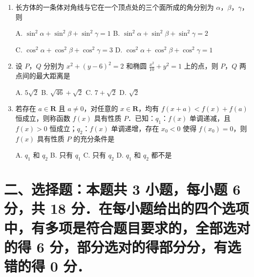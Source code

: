 \documentclass[a4paper,12pt]{ctexart}
\begin{document}
\begin{enumerate}[leftmargin=2em,itemsep=4pt]
\item 长方体的一条体对角线与它在一个顶点处的三个面所成的角分别为 $\alpha$，$\beta$，$\gamma$，则

\vspace{1pt}
{\hspace{1.5em} A.\; $\sin^{2}\alpha + \sin^{2}\beta + \sin^{2}\gamma = 1$ \hfill
 B.\; $\sin^{2}\alpha + \sin^{2}\beta + \sin^{2}\gamma = 2$}

\vspace{1pt}
{\hspace{1.5em} C.\; $\cos^{2}\alpha + \cos^{2}\beta + \cos^{2}\gamma = 3$ \hfill
 D.\; $\cos^{2}\alpha + \cos^{2}\beta + \cos^{2}\gamma = 1$ \hspace{2em}}

\newpage

\item 设 $P$，$Q$ 分别为 $x^{2} + (y - 6)^{2} = 2$ 和椭圆 $\displaystyle\frac{x^{2}}{10} + y^{2} = 1$ 上的点，则 $P$，$Q$ 两点间的最大距离是

\vspace{1pt}
{\hspace{1.5em} A.\; $5\sqrt{2}$ \hfill
 B.\; $\sqrt{46} + \sqrt{2}$ \hfill
 C.\; $7 + \sqrt{2}$ \hfill
 D.\; $\sqrt{2}$ \hspace{2em}}

\item 若存在 $a \in \mathbf{R}$ 且 $a \neq 0$，对任意的 $x \in \mathbf{R}$，均有 $f(x + a) < f(x) + f(a)$ 恒成立，则称函数 $f(x)$ 具有性质 $P$．已知：$q_{1}$：$f(x)$ 单调递减，且 $f(x) > 0$ 恒成立；$q_{2}$：$f(x)$ 单调递增，存在 $x_{0} < 0$ 使得 $f(x_{0}) = 0$，则 $f(x)$ 具有性质 $P$ 的充分条件是

\vspace{1pt}
{\hspace{1.5em} A.\; $q_{1}$ 和 $q_{2}$ \hfill
 B.\; 只有 $q_{1}$ \hfill
 C.\; 只有 $q_{2}$ \hfill
 D.\; $q_{1}$ 和 $q_{2}$ 都不是 \hspace{2em}}

\end{enumerate}


\section*{二、选择题：本题共 3 小题，每小题 6 分，共 18 分．在每小题给出的四个选项中，有多项是符合题目要求的，全部选对的得 6 分，部分选对的得部分分，有选错的得 0 分．}
\end{document}
